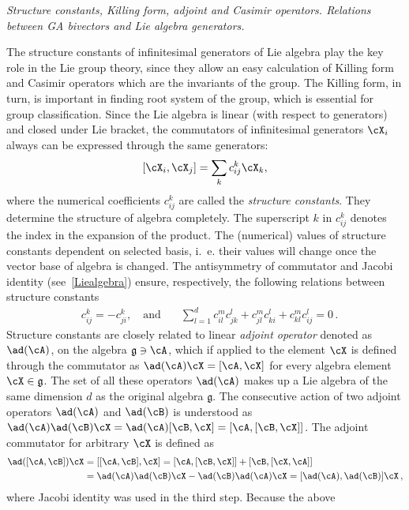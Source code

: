 \begin{unit}\textit{Structure constants, Killing form, adjoint and Casimir operators.
Relations between GA bivectors and Lie algebra generators.}
\label{StructureConstants}

The structure constants of infinitesimal generators of Lie algebra
play the key role in the Lie group theory, since they allow an
easy calculation of Killing form and Casimir operators which are
the invariants of the group. The Killing form, in turn, is
important in finding root system of the group, which is essential
for group classification. Since the Lie algebra is linear (with respect to generators)
and closed under Lie bracket, the commutators of infinitesimal
generators $\cX_i$ always can be expressed through the  same
generators:
\[[\cX_i,\cX_j]=\sum_k c_{ij}^k\cX_k,\]
where the numerical coefficients $c_{ij}^k$ are called the
\textit{structure constants}. They  determine the structure of
algebra completely.  The superscript $k$ in $c_{ij}^k$ denotes the index in
the expansion of the product. The (numerical) values of
structure constants dependent on selected basis, i.~e. their
values will change once the vector base of algebra is changed. The
antisymmetry of commutator and  Jacobi identity
(see~\ref{Liealgebra}) ensure, respectively, the following relations between
structure constants
\[
\begin{split}
  &c_{ij}^k=-c_{ji}^k,\quad \textrm{and}\quad 
  & \sum_{l=1}^d c_{il}^m c_{jk}^l+c_{jl}^m c_{ki}^l+c_{kl}^m c_{ij}^l
  =0\,.
\end{split}
\]
Structure constants are closely related to linear \textit{adjoint
operator} denoted as $\ad(\cA)$, on the algebra
$\mathfrak{g}\ni\cA$, which if applied to the element $\cX$ is
defined through the commutator as $\ad(\cA)\cX = [\cA,\cX]$ for
every algebra element $\cX\in\mathfrak{g}$. The set of all these
operators $\ad(\cA)$ makes up a Lie algebra of the same dimension
$d$ as the original algebra $\mathfrak{g}$. The consecutive action
of two adjoint operators  $\ad(\cA)$ and $\ad(\cB)$ is understood
as $\ad(\cA)\ad(\cB)\cX=\ad(\cA)[\cB,\cX]=[\cA,[\cB,\cX]]$.
The adjoint commutator for arbitrary $\cX$ is defined as
\[
\begin{split}
  \ad([\cA,\cB])\cX& = [ [\cA,\cB],\cX]= [\cA ,[\cB,\cX]]+ [\cB ,[\cX,\cA]]\\
           &=  \ad(\cA)  \ad(\cB)\cX -\ad(\cB)  \ad(\cA) \cX= [\ad(\cA),\ad(\cB)]
           \cX\,,
\end{split}
\]
where Jacobi identity was used in the third step. Because the above 

\end{unit}
